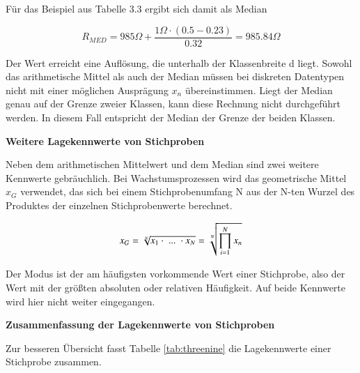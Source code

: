 \noindent F\"{u}r das Beispiel aus Tabelle 3.3 ergibt sich damit als Median 

\begin{equation}\label{eq:threetwentyseven}
R_{MED} =985\Omega +\dfrac{1\Omega \cdot (0.5-0.23)}{0.32} = 985.84 \Omega
\end{equation}

\noindent Der Wert erreicht eine Aufl\"{o}sung, die unterhalb der Klassenbreite d liegt. Sowohl das arithmetische Mittel als auch der Median m\"{u}ssen bei diskreten Datentypen nicht mit einer m\"{o}glichen Auspr\"{a}gung $x_{n}$ \"{u}bereinstimmen. Liegt der Median genau auf der Grenze zweier Klassen, kann diese Rechnung nicht durchgef\"{u}hrt werden. In diesem Fall entspricht der Median der Grenze der beiden Klassen.\bigskip

{\selectfont
\noindent\textbf{Weitere Lagekennwerte von Stichproben}}\smallskip

\noindent Neben dem arithmetischen Mittelwert und dem Median sind zwei weitere Kennwerte gebr\"{a}uchlich. Bei Wachstumsprozessen wird das geometrische Mittel $x_{G}$ verwendet, das sich bei einem Stichprobenumfang N aus der N-ten Wurzel des Produktes der einzelnen Stichprobenwerte berechnet.

\begin{equation}\label{eq:threetwentyeight}
x_{G} =\sqrt[{N}]{x_{1} \cdot {\rm \; ...\; }\cdot x_{N} } =\sqrt[{N}]{\prod _{i=1}^{N}x_{n}}
\end{equation}

\noindent Der Modus ist der am h\"{a}ufigsten vorkommende Wert einer Stichprobe, also der Wert mit der gr\"{o}{\ss}ten absoluten oder relativen H\"{a}ufigkeit. Auf beide Kennwerte wird hier nicht weiter eingegangen.

\clearpage

{\selectfont
\noindent\textbf{Zusammenfassung der Lagekennwerte von Stichproben}}\smallskip

\noindent Zur besseren \"{U}bersicht fasst Tabelle \ref{tab:threenine} die Lagekennwerte einer Stichprobe zusammen.

